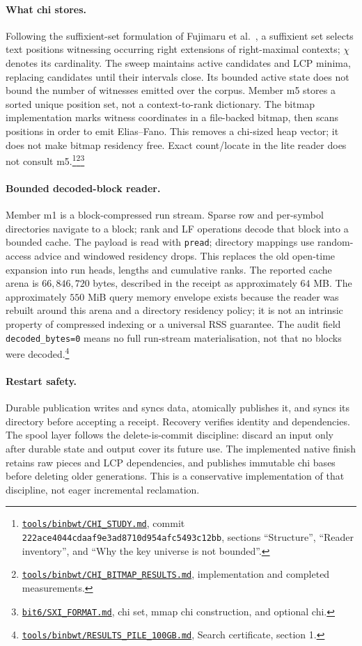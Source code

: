 \documentclass[10pt]{article}
\newcommand{\qnum}[2]{#2}
\newcommand{\ev}[2]{\footnote{\href{https://github.com/pangenome/sxgc/blob/c46a85217b9b269c91179cbebc396f96453181af/#1}{\nolinkurl{#1}}, #2.}}
\newcommand{\old}[3]{\footnote{\href{https://github.com/pangenome/sxgc/blob/#1/#2}{\nolinkurl{#2}}, commit \texttt{#1}, #3.}}
\begin{document}
\paragraph{What chi stores.}
Following the suffixient-set formulation of Fujimaru et al.~\cite{suffixient}, a suffixient set
selects text positions witnessing occurring right extensions of right-maximal contexts; $\chi$
denotes its cardinality. The sweep maintains active candidates and LCP minima, replacing candidates
until their intervals close. Its bounded active state does not bound the number of witnesses emitted
over the corpus. Member m5 stores a sorted unique position set, not a context-to-rank dictionary.
The bitmap implementation marks witness coordinates in a file-backed bitmap, then scans positions in
order to emit Elias--Fano. This removes a chi-sized heap vector; it does not make bitmap residency
free. Exact count/locate in the lite reader does not consult
m5.\old{222ace4044cdaaf9e3ad8710d954afc5493c12bb}{tools/binbwt/CHI_STUDY.md}{sections ``Structure'',
``Reader inventory'', and ``Why the key universe is not
bounded''}\ev{tools/binbwt/CHI_BITMAP_RESULTS.md}{implementation and completed
measurements}\ev{bit6/SXI_FORMAT.md}{chi set, mmap chi construction, and optional chi}

\paragraph{Bounded decoded-block reader.}
Member m1 is a block-compressed run stream. Sparse row and per-symbol directories navigate to a
block; rank and LF operations decode that block into a bounded cache. The payload is read with
\texttt{pread}; directory mappings use random-access advice and windowed residency drops. This
replaces the old open-time expansion into run heads, lengths and cumulative ranks. The reported
cache arena is $\qnum{arena}{66{,}846{,}720}$ bytes, described in the receipt as approximately
$\qnum{arenashort}{64}$ MB. The approximately $\qnum{rsscap}{550}$ MiB query memory envelope exists
because the reader was rebuilt around this arena and a directory residency policy; it is not an
intrinsic property of compressed indexing or a universal RSS guarantee. The audit field
\texttt{decoded\_bytes=\qnum{decoded}{0}} means no full run-stream materialisation, not that no
blocks were decoded.\ev{tools/binbwt/RESULTS_PILE_100GB.md}{Search certificate, section 1}

\paragraph{Restart safety.}
Durable publication writes and syncs data, atomically publishes it, and syncs its directory before
accepting a receipt. Recovery verifies identity and dependencies. The spool layer follows the
delete-is-commit discipline: discard an input only after durable state and output cover its future
use. The implemented native finish retains raw pieces and LCP dependencies, and publishes immutable
chi bases before deleting older generations. This is a conservative implementation of that
discipline, not eager incremental reclamation.
\end{document}
